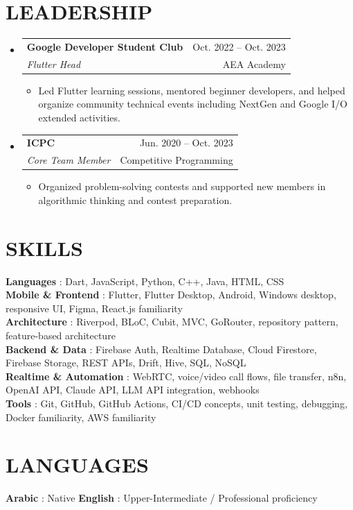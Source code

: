 \documentclass[letterpaper,11pt]{article}
\makeatletter
\newcommand{\resumeItem}[1]{
  \item\small{
    {#1 \vspace{-1pt}}
  }
}
\newcommand{\resumeSubheading}[4]{
  \vspace{-1pt}\item
    \begin{tabular*}{\textwidth}[t]{l@{\extracolsep{\fill}}r}
      \textbf{#1} & {\color{dark-grey}\small #2}\vspace{1pt}\\
      \textit{#3} & {\color{dark-grey} \small #4}\\
    \end{tabular*}\vspace{-4pt}
}
\newcommand{\resumeSubHeadingListStart}{\begin{itemize}[leftmargin=0in, label={}]}
\newcommand{\resumeSubHeadingListEnd}{\end{itemize}}
\newcommand{\resumeItemListStart}{\begin{itemize}}
\newcommand{\resumeItemListEnd}{\end{itemize}\vspace{0pt}}
\makeatother
\begin{document}
\section{LEADERSHIP}
  \resumeSubHeadingListStart
    \resumeSubheading
      {Google Developer Student Club}{Oct. 2022 -- Oct. 2023}
      {Flutter Head}{AEA Academy}
      \resumeItemListStart
        \resumeItem{Led Flutter learning sessions, mentored beginner developers, and helped organize community technical events including NextGen and Google I/O extended activities.}
      \resumeItemListEnd

    \resumeSubheading
      {ICPC}{Jun. 2020 -- Oct. 2023}
      {Core Team Member}{Competitive Programming}
      \resumeItemListStart
        \resumeItem{Organized problem-solving contests and supported new members in algorithmic thinking and contest preparation.}
      \resumeItemListEnd
  \resumeSubHeadingListEnd

\section{SKILLS}
 \begin{itemize}[leftmargin=0in, label={}]
    \small{\item{
     \textbf{Languages} {: Dart, JavaScript, Python, C++, Java, HTML, CSS}\vspace{2pt} \\
     \textbf{Mobile \& Frontend} {: Flutter, Flutter Desktop, Android, Windows desktop, responsive UI, Figma, React.js familiarity}\vspace{2pt} \\
     \textbf{Architecture} {: Riverpod, BLoC, Cubit, MVC, GoRouter, repository pattern, feature-based architecture}\vspace{2pt} \\
     \textbf{Backend \& Data} {: Firebase Auth, Realtime Database, Cloud Firestore, Firebase Storage, REST APIs, Drift, Hive, SQL, NoSQL}\vspace{2pt} \\
     \textbf{Realtime \& Automation} {: WebRTC, voice/video call flows, file transfer, n8n, OpenAI API, Claude API, LLM API integration, webhooks}\vspace{2pt} \\
     \textbf{Tools} {: Git, GitHub, GitHub Actions, CI/CD concepts, unit testing, debugging, Docker familiarity, AWS familiarity}
    }}
 \end{itemize}

\section{LANGUAGES}
 \begin{itemize}[leftmargin=0in, label={}]
    \small{\item{
     \textbf{Arabic} {: Native} \hspace{12pt}
     \textbf{English} {: Upper-Intermediate / Professional proficiency}
    }}
 \end{itemize}

\end{document}
